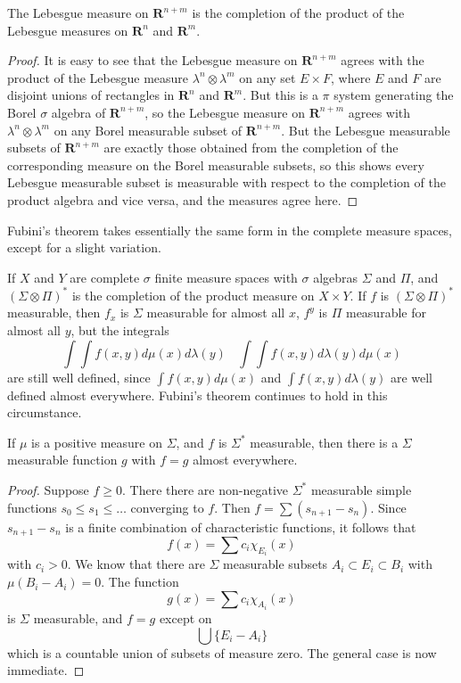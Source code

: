 \begin{theorem}
    The Lebesgue measure on $\mathbf{R}^{n + m}$ is the completion of the product of the Lebesgue measures on $\mathbf{R}^n$ and $\mathbf{R}^m$.
\end{theorem}
\begin{proof}
    It is easy to see that the Lebesgue measure on $\mathbf{R}^{n+m}$ agrees with the product of the Lebesgue measure $\lambda^n \otimes \lambda^m$ on any set $E \times F$, where $E$ and $F$ are disjoint unions of rectangles in $\mathbf{R}^n$ and $\mathbf{R}^m$. But this is a $\pi$ system generating the Borel $\sigma$ algebra of $\mathbf{R}^{n+m}$, so the Lebesgue measure on $\mathbf{R}^{n+m}$ agrees with $\lambda^n \otimes \lambda^m$ on any Borel measurable subset of $\mathbf{R}^{n+m}$. But the Lebesgue measurable subsets of $\mathbf{R}^{n+m}$ are exactly those obtained from the completion of the corresponding measure on the Borel measurable subsets, so this shows every Lebesgue measurable subset is measurable with respect to the completion of the product algebra and vice versa, and the measures agree here.
\end{proof}

Fubini's theorem takes essentially the same form in the complete measure spaces, except for a slight variation.

\begin{theorem}
    If $X$ and $Y$ are complete $\sigma$ finite measure spaces with $\sigma$ algebras $\Sigma$ and $\Pi$, and $(\Sigma \otimes \Pi)^*$ is the completion of the product measure on $X \times Y$. If $f$ is $(\Sigma \otimes \Pi)^*$ measurable, then $f_x$ is $\Sigma$ measurable for almost all $x$, $f^y$ is $\Pi$ measurable for almost all $y$, but the integrals
    \[ \int \int f(x,y) d\mu(x) d\lambda(y)\ \ \ \ \int \int f(x,y) d\lambda(y) d\mu(x) \]
    are still well defined, since $\int f(x,y) d\mu(x)$ and $\int f(x,y) d\lambda(y)$ are well defined almost everywhere. Fubini's theorem continues to hold in this circumstance.
\end{theorem}

\begin{lemma}
    If $\mu$ is a positive measure on $\Sigma$, and $f$ is $\Sigma^*$ measurable, then there is a $\Sigma$ measurable function $g$ with $f = g$ almost everywhere.
\end{lemma}
\begin{proof}
    Suppose $f \geq 0$. There there are non-negative $\Sigma^*$ measurable simple functions $s_0 \leq s_1 \leq \dots$ converging to $f$. Then $f = \sum (s_{n+1} - s_n)$. Since $s_{n+1} - s_n$ is a finite combination of characteristic functions, it follows that
    \[ f(x) = \sum c_i \chi_{E_i}(x) \]
    with $c_i > 0$. We know that there are $\Sigma$ measurable subsets $A_i \subset E_i \subset B_i$ with $\mu(B_i - A_i) = 0$. The function
    \[ g(x) = \sum c_i \chi_{A_i}(x) \]
    is $\Sigma$ measurable, and $f = g$ except on 
    \[ \bigcup \{ E_i - A_i \} \]
    which is a countable union of subsets of measure zero. The general case is now immediate.
\end{proof}

